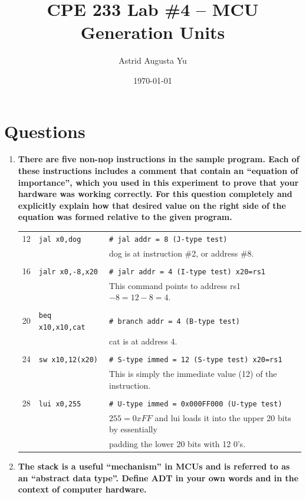 \documentclass{article}
\author{Astrid Augusta Yu}
\title{CPE 233 Lab \#4 -- MCU Generation Units}
\date{\today}
\begin{document}
\maketitle
\tableofcontents

\section{Questions}

\begin{enumerate}
    \item \textbf{There are five non-nop instructions in the sample program. Each of these instructions includes a comment that contain an “equation of importance”, which you used in this experiment to prove that your hardware was working correctly. For this question completely and explicitly explain how that desired value on the right side of the equation was formed relative to the given program. }

        \begin{tabular}{r l l}
            12 & \texttt{jal    x0,dog       } & \texttt{\# jal addr     =   8   (J-type test)          }\\
            && dog is at instruction \#2, or address \#8. \\ \\
            16 & \texttt{jalr   x0,-8,x20    } & \texttt{\# jalr addr    =   4   (I-type test) x20=rs1  }\\
            && This command points to address rs1$- 8 = 12 - 8 = 4$.  \\ \\
            20 & \texttt{beq    x10,x10,cat  } & \texttt{\# branch addr  =   4   (B-type test)          }\\
            && cat is at address 4.\\ \\
            24 & \texttt{sw     x10,12(x20)  } & \texttt{\# S-type immed =  12   (S-type test) x20=rs1  }\\
            && This is simply the immediate value (12) of the instruction. \\ \\
            28 & \texttt{lui    x0,255       } & \texttt{\# U-type immed =  0x000FF000 (U-type test)    }\\
            && $255=0xFF$ and lui loads it into the upper 20 bits by essentially \\
            &&padding the lower 20 bits with 12 0's. 
        \end{tabular}
    \item \textbf{The stack is a useful “mechanism” in MCUs and is referred to as an “abstract data type”. Define ADT in your own words and in the context of computer hardware.}
    

\end{enumerate}
\end{document}
